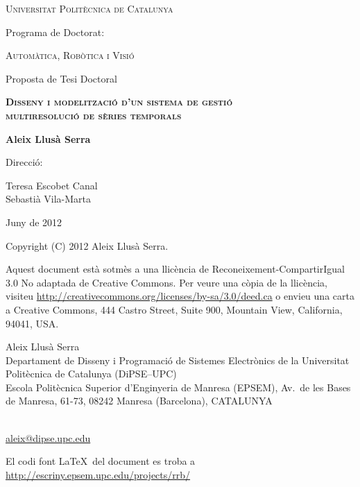 \begin{titlepage}
  \begin{center} 

   

    {\Large \scshape Universitat Politècnica de Catalunya} \vskip 1cm 

    {Programa de Doctorat:} \vskip 0.5cm 
    
    {\scshape Automàtica, Robòtica i Visió} \vfill%

    {Proposta de Tesi Doctoral} \vskip 1cm 
    
    {\scshape \bfseries \Large Disseny i modelització d'un sistema de gestió\\
       multiresolució de sèries temporals} \vskip 2cm

    {\bfseries Aleix Llusà Serra} \vfill%

    {Direcció:}
       
    {Teresa Escobet Canal \\
    Sebastià Vila-Marta}  \vskip 1cm 


    {Juny de 2012}

\end{center}
\end{titlepage}

{
  \thispagestyle{empty}

  \mbox{}

  \vfill

  \cc\bysa

  {\small
  Copyright (C) 2012 Aleix Llusà Serra.
  

  {\footnotesize
    Aquest document està sotmès a una llicència de Reconeixement-CompartirIgual 3.0 No adaptada de Creative Commons. Per veure una còpia de la llicència, visiteu \url{http://creativecommons.org/licenses/by-sa/3.0/deed.ca} o envieu una carta a Creative Commons, 444 Castro Street, Suite 900, Mountain View, California, 94041, USA.
  }


    Aleix Llusà Serra\\
    Departament de Disseny i Programació de Sistemes Electrònics
      de la Universitat Politècnica de Catalunya (DiPSE--UPC)\\
    Escola Politècnica Superior d'Enginyeria de Manresa (EPSEM),
    Av.\ de les Bases de Manresa, 61-73,
    08242 Manresa (Barcelona),
    CATALUNYA 
    }\\
    \url{aleix@dipse.upc.edu}

    {\footnotesize
      El codi font \LaTeX\ del document es troba a 
      \url{http://escriny.epsem.upc.edu/projects/rrb/}
    }
}


